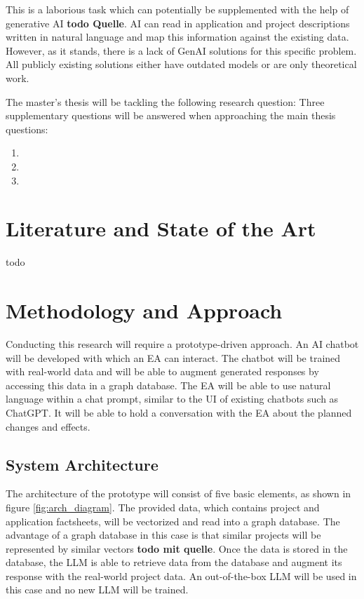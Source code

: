 \documentclass[english]{lni}
\begin{document}
This is a laborious task which can potentially be supplemented with the help of generative AI \textbf{todo Quelle}. AI can read in application and project descriptions written in natural language and map this information against the existing data. However, as it stands, there is a lack of GenAI solutions for this specific problem. All publicly existing solutions either have outdated models or are only theoretical work.

The master's thesis will be tackling the following research question:  Three supplementary questions will be answered when approaching the main thesis questions:
\begin{enumerate}
    \item {}
    \item {}
    \item {}
\end{enumerate}


\section{Literature and State of the Art}
todo

\section{Methodology and Approach}
Conducting this research will require a prototype-driven approach. An AI chatbot will be developed with which an EA can interact. The chatbot will be trained with real-world data and will be able to augment generated responses by accessing this data in a graph database. The EA will be able to use natural language within a chat prompt, similar to the UI of existing chatbots such as ChatGPT. It will be able to hold a conversation with the EA about the planned changes and effects.

\subsection{System Architecture}
The architecture of the prototype will consist of five basic elements, as shown in figure \ref{fig:arch_diagram}. The provided data, which contains project and application factsheets, will be vectorized and read into a graph database. The advantage of a graph database in this case is that similar projects will be represented by similar vectors \textbf{todo mit quelle}. Once the data is stored in the database, the LLM is able to retrieve data from the database and augment its response with the real-world project data. An out-of-the-box LLM will be used in this case and no new LLM will be trained.
\end{document}
